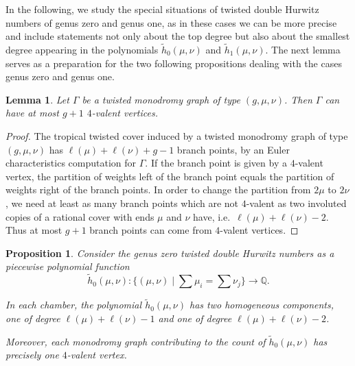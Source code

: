 \documentclass[10pt]{amsart}
\theoremstyle{plain}
\theoremstyle{definition}
\theoremstyle{definition}
\theoremstyle{plain}
\newtheorem{lemma}[lemma]{Lemma}
\theoremstyle{plain}
\newtheorem{prop}[prop]{Proposition}
\theoremstyle{remark}
\theoremstyle{plain}
\theoremstyle{plain}
\begin{document}
In the following, we study the special situations of twisted double Hurwitz numbers of genus zero and genus one, as in these cases we can be more precise and include statements not only about the top degree but also about the smallest degree appearing in the polynomials $\tilde{h}_0(\mu,\nu)$ and $\tilde{h}_1(\mu,\nu)$. The next lemma serves as a preparation for the two following propositions dealing with the cases genus zero and genus one.
 
\begin{lemma}\label{lem-g+1}
Let $\Gamma$ be a twisted monodromy graph of type $(g,\mu,\nu)$. Then $\Gamma$ can have at most $g+1$ $4$-valent vertices.
\end{lemma}

\begin{proof}
The tropical twisted cover induced by a twisted monodromy graph of type $(g,\mu,\nu)$ has $\ell(\mu)+\ell(\nu)+g-1$ branch points, by an Euler characteristics computation for $\Gamma$. If the branch point is given by a $4$-valent vertex, the partition of weights left of the branch point equals the partition of weights right of the branch points. In order to change the partition from $2\mu$ to $2\nu$, we need at least as many branch points which are not $4$-valent as two involuted copies of a rational cover with ends $\mu$ and $\nu$ have, i.e.\ $\ell(\mu)+\ell(\nu)-2$. Thus at most $g+1$ branch points can come from $4$-valent vertices.
\end{proof}
 
 \begin{prop}\label{prop-ppingenus0}
 Consider the genus zero twisted double Hurwitz numbers as a piecewise polynomial function 
$$\tilde{h}_0(\mu,\nu):\Big\{(\mu,\nu) \mid \sum \mu_i=\sum\nu_j\Big\} \longrightarrow\mathbb{Q}.$$ 

In each chamber, the polynomial $\tilde{h}_0(\mu,\nu)$ has two homogeneous components, one of degree $\ell(\mu)+\ell(\nu)-1$ and one of degree $\ell(\mu)+\ell(\nu)-2$.

Moreover, each monodromy graph contributing to the count of  $\tilde{h}_0(\mu,\nu)$ has precisely one $4$-valent vertex.
 \end{prop}
 
\end{document}
